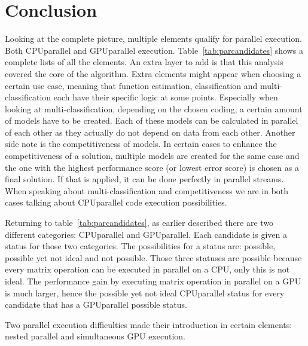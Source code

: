 \section{Conclusion}
Looking at the complete picture, multiple elements qualify for parallel execution.
Both CPUparallel and GPUparallel execution.
Table~\ref{tab:parcandidates} shows a complete lists of all the elements.
An extra layer to add is that this analysis covered the core of the algorithm.
Extra elements might appear when choosing a certain use case, meaning that function estimation, classification and multi-classification each have their specific logic at some points.
Especially when looking at multi-classification, depending on the chosen coding, a certain amount of models have to be created. 
Each of these models can be calculated in parallel of each other as they actually do not depend on data from each other.
Another side note is the competitiveness of models.
In certain cases to enhance the competitiveness of a solution, multiple models are created for the same case and the one with the highest performance score (or lowest error score) is chosen as a final solution.
If that is applied, it can be done perfectly in parallel streams.
When speaking about multi-classification and competitiveness we are in both cases talking about CPUparallel code execution possibilities.
\par 
Returning to table~\ref{tab:parcandidates}, as earlier described there are two different categories: CPUparallel and GPUparallel.
Each candidate is given a status for those two categories.
The possibilities for a status are: possible, possible yet not ideal and not possible.
Those three statuses are possible because every matrix operation can be executed in parallel on a CPU, only this is not ideal.
The performance gain by executing matrix operation in parallel on a GPU is much larger, hence the possible yet not ideal CPUparallel status for every candidate that has a GPUparallel possible status.
\par
Two parallel execution difficulties made their introduction in certain elements: nested parallel and simultaneous GPU execution. 
